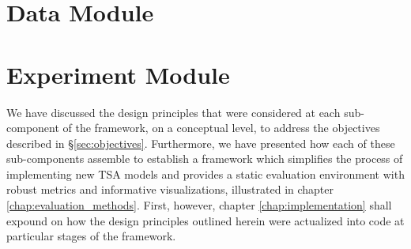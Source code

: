 \documentclass[../../fyp.tex]{subfiles}
\begin{document}
\section{Data Module}


\section{Experiment Module} \label{sec:experiment_module}


We have discussed  the design principles that were considered at each sub-component of the framework, on a conceptual level, to address the objectives described in \S\ref{sec:objectives}. Furthermore, we have presented how each of these sub-components assemble to establish a framework which simplifies the process of implementing new TSA models and provides a static evaluation environment with robust metrics and informative visualizations, illustrated in chapter \ref{chap:evaluation_methods}. First, however, chapter \ref{chap:implementation} shall expound on how the design principles outlined herein were actualized into code at  particular stages of the framework.
\end{document}
